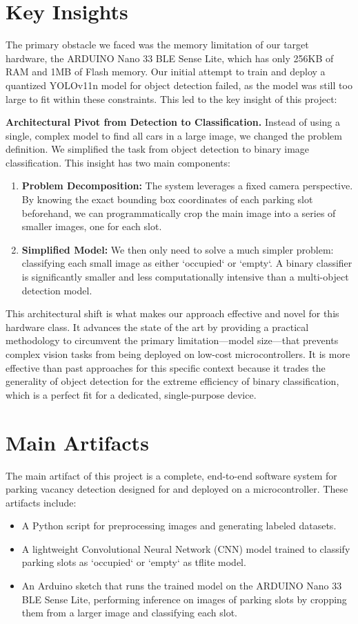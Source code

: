 \documentclass[sigconf,10pt,nonacm]{acmart}
\begin{document}
\section{Key Insights}
\label{sec:key-insights}
The primary obstacle we faced was the memory limitation of our target hardware, the ARDUINO Nano 33 BLE Sense Lite, which has only 256KB of RAM and 1MB of Flash memory. Our initial attempt to train and deploy a quantized YOLOv11n model for object detection failed, as the model was still too large to fit within these constraints. This led to the key insight of this project:

\noindent\textbf{Architectural Pivot from Detection to Classification.} Instead of using a single, complex model to find all cars in a large image, we changed the problem definition. We simplified the task from object detection to binary image classification. This insight has two main components:
\begin{enumerate}
    \item \textbf{Problem Decomposition:} The system leverages a fixed camera perspective. By knowing the exact bounding box coordinates of each parking slot beforehand, we can programmatically crop the main image into a series of smaller images, one for each slot.
    \item \textbf{Simplified Model:} We then only need to solve a much simpler problem: classifying each small image as either `occupied` or `empty`. A binary classifier is significantly smaller and less computationally intensive than a multi-object detection model.
\end{enumerate}

This architectural shift is what makes our approach effective and novel for this hardware class. It advances the state of the art by providing a practical methodology to circumvent the primary limitation—model size—that prevents complex vision tasks from being deployed on low-cost microcontrollers. It is more effective than past approaches for this specific context because it trades the generality of object detection for the extreme efficiency of binary classification, which is a perfect fit for a dedicated, single-purpose device.

\section{Main Artifacts}
\label{sec:main-artifacts}
The main artifact of this project is a complete, end-to-end software system for parking vacancy detection designed for and deployed on a microcontroller. These artifacts include:
\begin{itemize}
    \item A Python script for preprocessing images and generating labeled datasets.
    \item A lightweight Convolutional Neural Network (CNN) model trained to classify parking slots as `occupied` or `empty` as tflite model.
    \item An Arduino sketch that runs the trained model on the ARDUINO Nano 33 BLE Sense Lite, performing inference on images of parking slots by cropping them from a larger image and classifying each slot.
\end{itemize}
\end{document}
